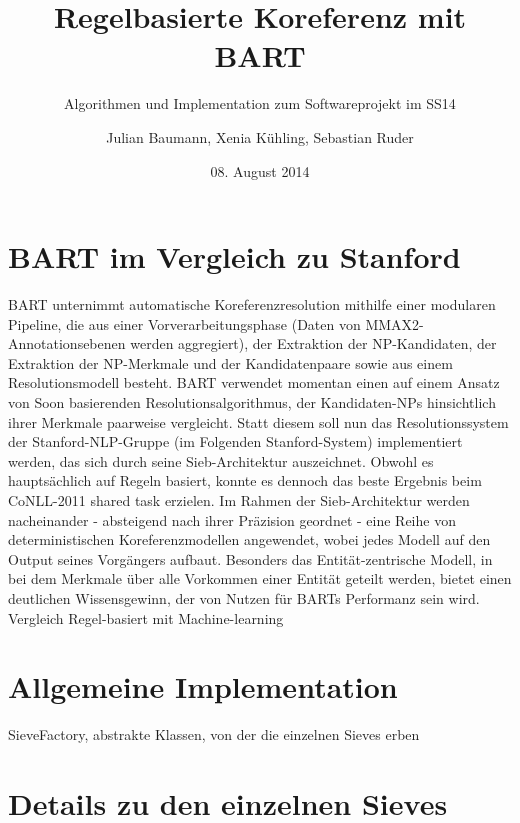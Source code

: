 \documentclass{scrartcl}
\author{Julian Baumann, Xenia K\"uhling, Sebastian Ruder}
\date{08. August 2014}
\title{Regelbasierte Koreferenz mit BART}
\subtitle{Algorithmen und Implementation zum Softwareprojekt im SS14}
\begin{document}
\maketitle

\section{BART im Vergleich zu Stanford}

BART unternimmt automatische Koreferenzresolution mithilfe einer modularen Pipeline, die aus einer Vorverarbeitungsphase (Daten von MMAX2-Annotationsebenen werden aggregiert), der Extraktion der NP-Kandidaten, der Extraktion der NP-Merkmale und der Kandidatenpaare sowie aus einem Resolutionsmodell besteht.
 BART verwendet momentan einen auf einem Ansatz von Soon basierenden Resolutionsalgorithmus, der Kandidaten-NPs hinsichtlich ihrer Merkmale paarweise vergleicht. Statt diesem soll nun das Resolutionssystem der Stanford-NLP-Gruppe (im Folgenden Stanford-System) implementiert werden, das sich durch seine Sieb-Architektur auszeichnet. Obwohl es haupts\"achlich auf Regeln basiert, konnte es dennoch das beste Ergebnis beim CoNLL-2011 shared task erzielen. Im Rahmen der Sieb-Architektur werden nacheinander - absteigend nach ihrer Pr\"azision geordnet - eine Reihe von deterministischen Koreferenzmodellen angewendet, wobei jedes Modell auf den Output seines Vorg\"angers aufbaut. Besonders das Entit\"at-zentrische Modell, in bei dem Merkmale \"uber alle Vorkommen einer Entit\"at geteilt werden, bietet einen deutlichen Wissensgewinn, der von Nutzen f\"ur BARTs Performanz sein wird.
Vergleich Regel-basiert mit Machine-learning

\section{Allgemeine Implementation}

SieveFactory, abstrakte Klassen, von der die einzelnen Sieves erben

\section{Details zu den einzelnen Sieves}
\end{document}

